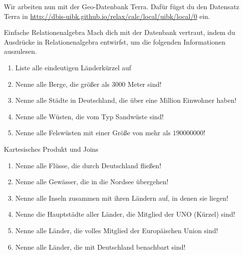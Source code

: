 \documentclass[12pt,a4paper,notitlepage,leqno]{article}
\begin{document}
\vspace{0.2cm}

Wir arbeiten nun mit der Geo-Datenbank Terra. Dafür fügst du den \textsf{Datensatz Terra} in \url{http://dbis-uibk.github.io/relax/calc/local/uibk/local/0} ein.

\begin{paufgabe}{Einfache Relationenalgebra}
    Mach dich mit der Datenbank vertraut, indem du Ausdrücke in Relationenalgebra entwirfst, um die folgenden Informationen auszulesen.
    \begin{enumerate}
            \item Liste alle eindeutigen Länderkürzel auf
            \item Nenne alle Berge, die größer als 3000 Meter sind!
            \item Nenne alle Städte in Deutschland, die über eine Million Einwohner haben!
            \item Nenne alle Wüsten, die vom Typ Sandwüste sind!
            \item Nenne alle Felswüsten mit einer Größe von mehr als $190000000$!
        \end{enumerate}
        
\end{paufgabe}

\begin{paufgabe}{Kartesisches Produkt und Joins}
\begin{enumerate}
            \item Nenne alle Flüsse, die durch Deutschland fließen!
            \item Nenne alle Gewässer, die in die Nordsee übergehen!
            \item Nenne alle Inseln zusammen mit ihren Ländern auf, in denen sie liegen!
            \item Nenne die Hauptstädte aller Länder, die Mitglied der UNO (Kürzel) sind!
            \item Nenne alle Länder, die volles Mitglied der Europäischen Union sind!
            \item Nenne alle Länder, die mit Deutschland benachbart sind!
        \end{enumerate}    
\end{paufgabe}
\end{document}
